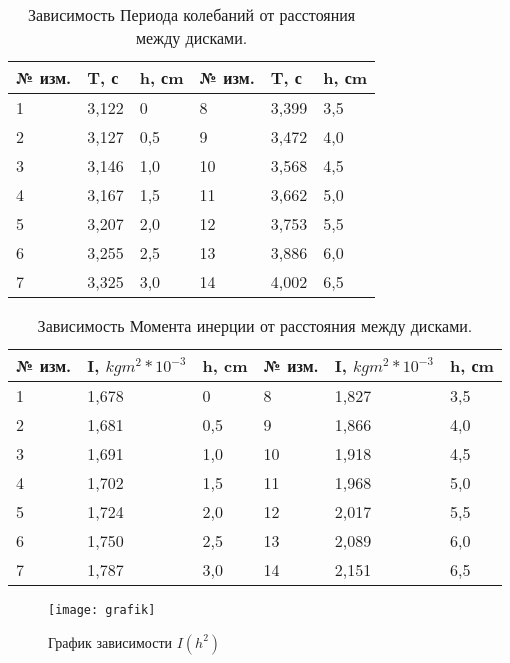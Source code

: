 \documentclass[12pt,a4paper]{article}
\begin{document}
		\begin{table}[b]
			\begin{center}
				\begin{tabular}{| l | l | l || l | l | l |}
					\hline
					№ изм. & T, с & h, сm & № изм. & T, с & h, сm \\ \hline
					1 & 3,122 & 0 & 8 & 3,399 & 3,5 \\ \hline
					2 & 3,127 & 0,5 & 9 & 3,472 & 4,0 \\ \hline
					3 & 3,146 & 1,0 & 10 & 3,568 & 4,5 \\ \hline
					4 & 3,167 & 1,5 & 11 & 3,662 & 5,0 \\ \hline
					5 & 3,207 & 2,0 & 12 & 3,753 & 5,5 \\ \hline
					6 & 3,255 & 2,5 & 13 & 3,886 & 6,0 \\ \hline
					7 & 3,325 & 3,0 & 14 & 4,002 & 6,5 \\ \hline
				\end{tabular}
				\caption{Зависимость Периода колебаний от расстояния между дисками.}
				\label{tab:period}
			\end{center}
		\end{table}

		\begin{table}[t]
			\begin{center}
				\begin{tabular}{| l | l | l || l | l | l |}
					\hline
					№ изм. & I, $kgm^2 * 10^{-3}$ & h, cm & № изм. & I, $kgm^2 * 10^{-3}$ & h, сm \\ \hline
					1 & 1,678 & 0 & 8 & 1,827 & 3,5 \\ \hline
					2 & 1,681 & 0,5 & 9 & 1,866 & 4,0 \\ \hline
					3 & 1,691 & 1,0 & 10 & 1,918 & 4,5 \\ \hline
					4 & 1,702 & 1,5 & 11 & 1,968 & 5,0 \\ \hline
					5 & 1,724 & 2,0 & 12 & 2,017 & 5,5 \\ \hline
					6 & 1,750 & 2,5 & 13 & 2,089 & 6,0 \\ \hline
					7 & 1,787 & 3,0 & 14 & 2,151 & 6,5 \\ \hline
				\end{tabular}
				\caption{Зависимость Момента инерции от расстояния между дисками.}
				\label{tab:moment}
			\end{center}
		\end{table}

		\begin{figure}


			\begin{center}
				\texttt{[image: grafik]}
				\caption{График зависимости $ I(h^2) $}
				\label{ris:grafik}
			\end{center}
		\end{figure}
\end{document}

